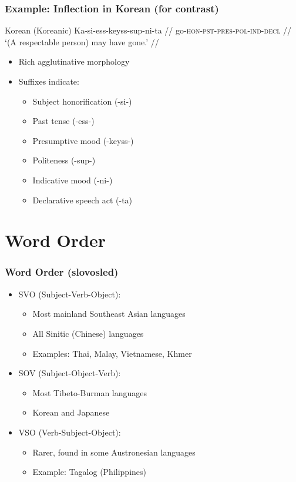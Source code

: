 \documentclass{beamer}
\begin{document}
\begin{frame}
\frametitle{Example: Inflection in Korean (for contrast)}
\begin{exampleblock}{Korean (Koreanic)}
  \ex
\begingl
\gla Ka-si-ess-keyss-sup-ni-ta //
\glb go-\textsc{hon}-\textsc{pst}-\textsc{pres}-\textsc{pol}-\textsc{ind}-\textsc{decl} //
\glft `(A respectable person) may have gone.' //
\endgl
\xe
\end{exampleblock}
\begin{itemize}
\item Rich agglutinative morphology
\item Suffixes indicate:
  \begin{itemize}
  \item Subject honorification (-si-)
  \item Past tense (-ess-)
  \item Presumptive mood (-keyss-)
  \item Politeness (-sup-)
  \item Indicative mood (-ni-)
  \item Declarative speech act (-ta)
  \end{itemize}
\end{itemize}
\end{frame}

\section{Word Order}

\begin{frame}
\frametitle{Word Order (slovosled)}
\begin{itemize}
\item SVO (Subject-Verb-Object):
  \begin{itemize}
  \item Most mainland Southeast Asian languages
  \item All Sinitic (Chinese) languages
  \item Examples: Thai, Malay, Vietnamese, Khmer
  \end{itemize}
\item SOV (Subject-Object-Verb):
  \begin{itemize}
  \item Most Tibeto-Burman languages
  \item Korean and Japanese
  \end{itemize}
\item VSO (Verb-Subject-Object):
  \begin{itemize}
  \item Rarer, found in some Austronesian languages
  \item Example: Tagalog (Philippines)
  \end{itemize}
\end{itemize}
\end{frame}
\end{document}
